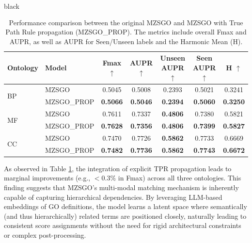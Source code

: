 \documentclass{article}
\begin{document}
\begin{color}{black}
\begin{table}[htbp]
    \centering
    \caption{Performance comparison between the original MZSGO and MZSGO with True Path Rule propagation (MZSGO\_PROP). The metrics include overall Fmax and AUPR, as well as AUPR for Seen/Unseen labels and the Harmonic Mean (H).}
    \label{tab:tpr_results}
    \small
    \begin{tabularx}{\textwidth}{l l c c c c c}
        \toprule
        \textbf{Ontology} & \textbf{Model} & \textbf{Fmax} $\uparrow$ & \textbf{AUPR} $\uparrow$ & \textbf{Unseen AUPR} $\uparrow$ & \textbf{Seen AUPR} $\uparrow$ & \textbf{H} $\uparrow$ \\
        \midrule
        \multirow{2}{*}{BP} & MZSGO & 0.5045 & 0.5008 & 0.2393 & 0.5021 & 0.3241 \\
         & MZSGO\_PROP & \textbf{0.5066} & \textbf{0.5046} & \textbf{0.2394} & \textbf{0.5060} & \textbf{0.3250} \\
        \midrule
        \multirow{2}{*}{MF} & MZSGO & 0.7611 & 0.7337 & \textbf{0.4806} & 0.7380 & 0.5821 \\
         & MZSGO\_PROP & \textbf{0.7628} & \textbf{0.7356} & \textbf{0.4806} & \textbf{0.7399} & \textbf{0.5827} \\
        \midrule
        \multirow{2}{*}{CC} & MZSGO & 0.7470 & 0.7726 & \textbf{0.5862} & 0.7733 & 0.6669 \\
         & MZSGO\_PROP & \textbf{0.7482} & \textbf{0.7736} & \textbf{0.5862} & \textbf{0.7743} & \textbf{0.6672} \\
        \bottomrule
    \end{tabularx}
\end{table}

As observed in Table \ref{tab:tpr_results}, the integration of explicit TPR propagation leads to marginal improvements (e.g., $<0.3\%$ in Fmax) across all three ontologies. This finding suggests that MZSGO's multi-modal matching mechanism is inherently capable of capturing hierarchical dependencies. By leveraging LLM-based embeddings of GO definitions, the model learns a latent space where semantically (and thus hierarchically) related terms are positioned closely, naturally leading to consistent score assignments without the need for rigid architectural constraints or complex post-processing.
\end{color}


 
\end{document}
